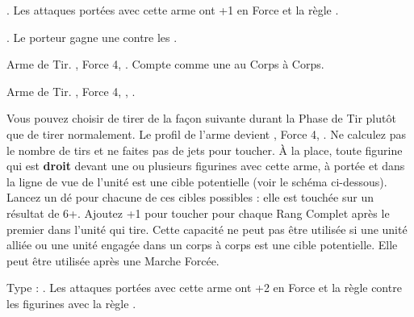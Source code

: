 \closearmyspecialrules





\vspace{1.5cm}
\startarmyarmoury

\startitemlistonecol

\listitemonecol{\infernalweapon{}} \hw{}. Les attaques portées avec cette arme ont +1 en Force et la règle \magicalattacks{}.

\listitemonecol{\infernalarmour{}} \platearmour{}. Le porteur gagne une  contre les \flamingattacks{}.

\listitemonecol{\flintlockaxe{}} Arme de Tir. , Force 4, . Compte comme une \halberd{} au Corps à Corps.

\listitemonecol{\blunderbuss{}} Arme de Tir. , Force 4, \walloflead{}, \quicktofire{}.

\enditemlistonecol

\noindent\textbf{\walloflead}

\vspace{5pt}
Vous pouvez choisir de tirer de la façon suivante durant la Phase de Tir plutôt que de tirer normalement. Le profil de l'arme devient , Force 4, \reload{}. Ne calculez pas le nombre de tirs et ne faites pas de jets pour toucher. À la place, toute figurine qui est \textbf{droit} devant une ou plusieurs figurines avec cette arme, à portée et dans la ligne de vue de l'unité est une cible potentielle (voir le schéma ci-dessous). Lancez un dé pour chacune de ces cibles possibles : elle est touchée sur un résultat de 6+. Ajoutez +1 pour toucher pour chaque Rang Complet après le premier dans l'unité qui tire. Cette capacité ne peut pas être utilisée si une unité alliée ou une unité engagée dans un corps à corps est une cible potentielle. Elle peut être utilisée après une Marche Forcée.

\newcommand{\blunderbussfire}{\Largerfontsize\textit{Feu !}}
\def\svgwidth{10cm}
\vspace{0.5cm}\begin{center}

\end{center}

\closearmyarmoury

\startarmymagicalitems

\armymagicalweapons

\startpricelist

Type : \hw{}. Les attaques portées avec cette arme ont +2 en Force et la règle  contre les figurines avec la règle \flammable{}.

